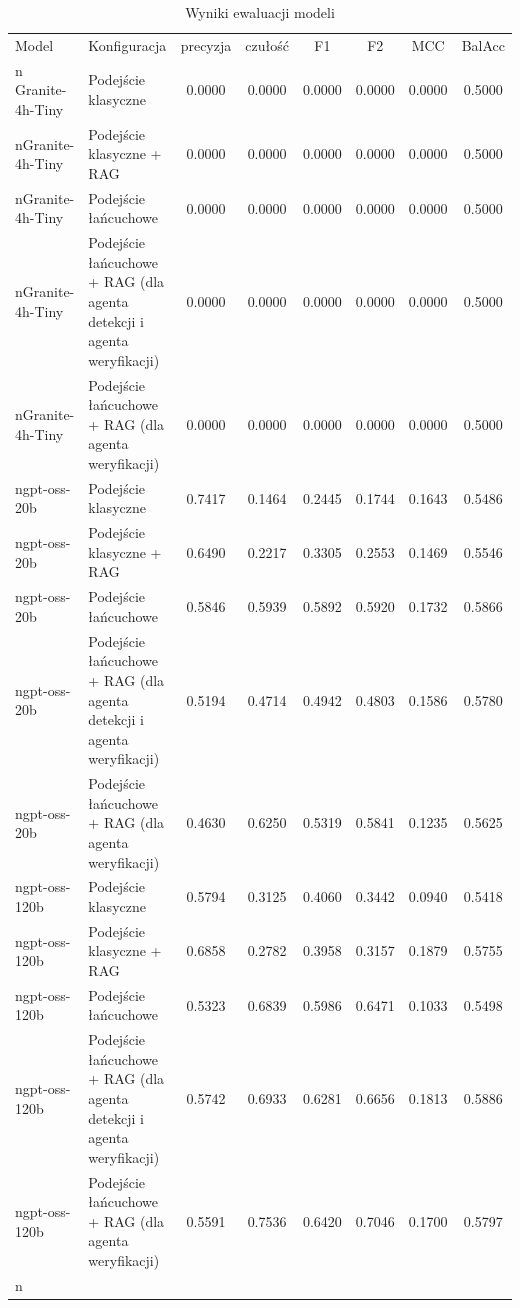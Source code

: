 \begin{table}[htbp]
\centering
\caption{Wyniki ewaluacji modeli}
\label{tab:wyniki}
\begin{tabular}{llcccccc}
\toprule
Model & Konfiguracja & precyzja & czułość & F1 & F2 & MCC & BalAcc \\n\midrule
Granite-4h-Tiny & Podejście klasyczne & 0.0000 & 0.0000 & 0.0000 & 0.0000 & 0.0000 & 0.5000 \\nGranite-4h-Tiny & Podejście klasyczne + RAG & 0.0000 & 0.0000 & 0.0000 & 0.0000 & 0.0000 & 0.5000 \\nGranite-4h-Tiny & Podejście łańcuchowe & 0.0000 & 0.0000 & 0.0000 & 0.0000 & 0.0000 & 0.5000 \\nGranite-4h-Tiny & Podejście łańcuchowe + RAG (dla agenta detekcji i agenta weryfikacji) & 0.0000 & 0.0000 & 0.0000 & 0.0000 & 0.0000 & 0.5000 \\nGranite-4h-Tiny & Podejście łańcuchowe + RAG (dla agenta weryfikacji) & 0.0000 & 0.0000 & 0.0000 & 0.0000 & 0.0000 & 0.5000 \\ngpt-oss-20b & Podejście klasyczne & 0.7417 & 0.1464 & 0.2445 & 0.1744 & 0.1643 & 0.5486 \\ngpt-oss-20b & Podejście klasyczne + RAG & 0.6490 & 0.2217 & 0.3305 & 0.2553 & 0.1469 & 0.5546 \\ngpt-oss-20b & Podejście łańcuchowe & 0.5846 & 0.5939 & 0.5892 & 0.5920 & 0.1732 & 0.5866 \\ngpt-oss-20b & Podejście łańcuchowe + RAG (dla agenta detekcji i agenta weryfikacji) & 0.5194 & 0.4714 & 0.4942 & 0.4803 & 0.1586 & 0.5780 \\ngpt-oss-20b & Podejście łańcuchowe + RAG (dla agenta weryfikacji) & 0.4630 & 0.6250 & 0.5319 & 0.5841 & 0.1235 & 0.5625 \\ngpt-oss-120b & Podejście klasyczne & 0.5794 & 0.3125 & 0.4060 & 0.3442 & 0.0940 & 0.5418 \\ngpt-oss-120b & Podejście klasyczne + RAG & 0.6858 & 0.2782 & 0.3958 & 0.3157 & 0.1879 & 0.5755 \\ngpt-oss-120b & Podejście łańcuchowe & 0.5323 & 0.6839 & 0.5986 & 0.6471 & 0.1033 & 0.5498 \\ngpt-oss-120b & Podejście łańcuchowe + RAG (dla agenta detekcji i agenta weryfikacji) & 0.5742 & 0.6933 & 0.6281 & 0.6656 & 0.1813 & 0.5886 \\ngpt-oss-120b & Podejście łańcuchowe + RAG (dla agenta weryfikacji) & 0.5591 & 0.7536 & 0.6420 & 0.7046 & 0.1700 & 0.5797 \\n\bottomrule
\end{tabular}
\end{table}
